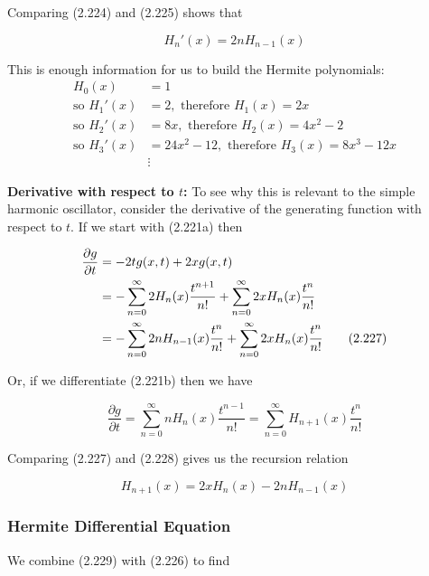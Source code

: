 \documentclass[11pt,a4paper]{article}
\begin{document}
Comparing (2.224) and (2.225) shows that

\begin{equation}
\boxed{H_n'(x) = 2nH_{n-1}(x)}
\tag{2.226}
\end{equation}

This is enough information for us to build the Hermite polynomials:
\begin{align*}
H_0(x) &= 1 \\
\text{so } H_1'(x) &= 2, \text{ therefore } H_1(x) = 2x \\
\text{so } H_2'(x) &= 8x, \text{ therefore } H_2(x) = 4x^2 - 2 \\
\text{so } H_3'(x) &= 24x^2 - 12, \text{ therefore } H_3(x) = 8x^3 - 12x \\
&\vdots
\end{align*}

\textbf{Derivative with respect to $t$:}
To see why this is relevant to the simple harmonic oscillator, consider the derivative of the generating function with respect to $t$. If we start with (2.221a) then

\begin{align}
\frac{\partial g}{\partial t} &= -2tg(x, t) + 2xg(x, t) \notag \\
&= -\sum_{n=0}^{\infty}2H_n(x)\frac{t^{n+1}}{n!} + \sum_{n=0}^{\infty}2xH_n(x)\frac{t^n}{n!} \notag \\
&= -\sum_{n=0}^{\infty}2nH_{n-1}(x)\frac{t^n}{n!} + \sum_{n=0}^{\infty}2xH_n(x)\frac{t^n}{n!}
\tag{2.227}
\end{align}

Or, if we differentiate (2.221b) then we have

\begin{equation}
\frac{\partial g}{\partial t} = \sum_{n=0}^{\infty}nH_n(x)\frac{t^{n-1}}{n!} = \sum_{n=0}^{\infty}H_{n+1}(x)\frac{t^n}{n!}
\tag{2.228}
\end{equation}

Comparing (2.227) and (2.228) gives us the recursion relation

\begin{equation}
\boxed{H_{n+1}(x) = 2xH_n(x) - 2nH_{n-1}(x)}
\tag{2.229}
\end{equation}

\subsubsection{Hermite Differential Equation}

We combine (2.229) with (2.226) to find
\end{document}

